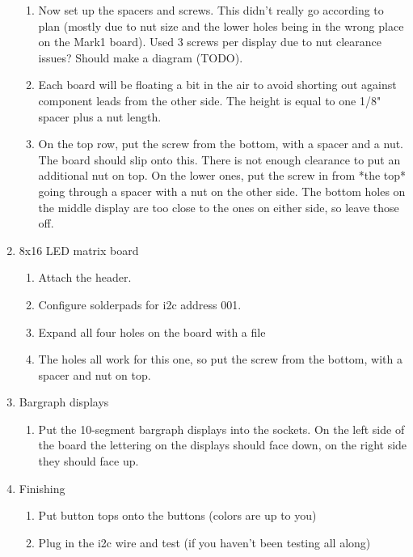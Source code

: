 \documentclass[11pt]{article}
\begin{document}
\begin{enumerate}
\begin{enumerate}
		\item Now set up the spacers and screws.  
			This didn't really go according
			to plan (mostly due to nut size and the lower holes being in the
			wrong place on the Mark1 board).
			Used 3 screws per display due to nut clearance issues?
			Should make a diagram (TODO).

		\item Each board will be floating a bit in the air to avoid shorting out
			against component leads from the other side.
			The height is equal to one 1/8" spacer plus a nut length.  

		\item On the top row, put the screw from the bottom, with a spacer and a nut.
			The board should slip onto this.
			There is not enough clearance to put an additional nut on top.
			On the lower ones, put the screw in from *the top* going through 
			a spacer with a nut on the other side.
			The bottom holes on the middle display are too close to the ones
			on either side, so leave those off.

	\end{enumerate}

\item 8x16 LED matrix board
	\begin{enumerate}

	\item	Attach the header.
	\item   Configure solderpads for i2c address 001.
	\item   Expand all four holes on the board with a file
	\item   The holes all work for this one, so put the screw from the bottom,
		with a spacer and nut on top.
	\end{enumerate}


\item Bargraph displays
	\begin{enumerate}

	\item	Put the 10-segment bargraph displays into the sockets.
		On the left side of the board the lettering on the displays should
		face down, on the right side they should face up.
	\end{enumerate}

\item Finishing
	\begin{enumerate}

	\item	Put button tops onto the buttons (colors are up to you)

	\item	Plug in the i2c wire and test (if you haven't been testing all along)
	\end{enumerate}


\end{enumerate}
\end{document}
